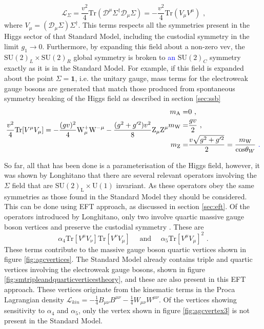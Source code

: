 %
\begin{equation}
\mathcal{L}_{\Sigma} = \frac{v^{2}}{4} \text{Tr} (\mathcal{D}^{\mu} \Sigma^{\dagger} \mathcal{D}_{\mu} \Sigma) = -\frac{v^{2}}{4}\text{Tr}(V_{\mu} V^{\mu}) \text{ ,} 
\end{equation}
%
\noindent where $V_{\mu} = (\mathcal{D}_{\mu}\Sigma) \Sigma^{\dagger}$.  This terms respects all the symmetries present in the Higgs sector of that Standard Model, including the custodial symmetry in the limit $g_{1} \rightarrow 0$.  Furthermore, by expanding this field about a non-zero vev, the $\text{SU}(2)_{L} \times \text{SU}(2)_{R}$ global symmetry is broken to \textcolor{blue}{an} $\text{SU}(2)_{C}$ symmetry exactly as it is in the Standard Model.  For example, if this field is expanded about the point $\Sigma = \textbf{1}$, i.e. the unitary gauge, mass terms for the electroweak gauge bosons are generated that match those produced from spontaneous symmetry breaking of the Higgs field as described in section \ref{sec:ssb}
%
\begin{equation}
\frac{v^{2}}{4}\text{Tr}[V^{\mu}V_{\mu}] = - \frac{(gv)^{2}}{4} \text{W}^{+}_{\mu} \text{W}^{-\mu} - \frac{(g^{2} + g'^{2})v^{2}}{8} \text{Z}_{\mu} \text{Z}^{\mu} \\
\begin{aligned}
m_{\text{A}} = & 0 \text{ ,} \\
m_{\text{W}} = & \frac{gv}{2} \text{ ,} \\
m_{\text{Z}} = & \frac{v\sqrt{g^{2} + g'^{2}}}{2} = \frac{m_{\text{W}}}{\text{cos}{\theta_{W}}} \text{ \textcolor{blue}{.}}
\end{aligned}
\end{equation}

So far, all that has been done is a parameterisation of the Higgs field, however, it was shown by Longhitano \cite{Longhitano:1980tm} that there are several relevant operators involving the $\Sigma$ field that are $\text{SU}(2)_{\text{L}} \times \text{U}(1)$ invariant.  As these operators obey the same symmetries as those found in the Standard Model they should be considered.  This can be done using EFT approach, as discussed in section \ref{sec:eft}.  Of the operators introduced by Longhitano, only two involve quartic massive gauge boson vertices and preserve the custodial symmetry \cite{Belyaev:1998ih}.  These are
%
\begin{equation}
\alpha_{4}\text{Tr}[V^{\mu}V_{\nu}]\text{Tr}[V^{\nu}V_{\mu}] \quad \text{ and } \quad \alpha_{5}\text{Tr}[V^{\mu}V_{\mu}]^{2} \text{ .}
\label{equ:newterms}
\end{equation}
%
\noindent These terms contribute to the massive gauge boson quartic vertices shown in figure \ref{fig:agcvertices}.  The Standard Model already contains triple and quartic vertices involving the electroweak gauge bosons, shown in figure \ref{fig:smtripleandquarticverticestheory}, and these are also present in this EFT approach.  These vertices originate from the kinematic terms in the Proca Lagrangian density $\mathcal{L}_{kin} = -\frac{1}{4}B_{\mu\nu}B^{\mu\nu} - \frac{1}{4}W_{\mu\nu}W^{\mu\nu}$.  Of the vertices showing sensitivity to $\alpha_{4}$ and $\alpha_{5}$, only the vertex shown in figure \ref{fig:agcvertex3} is not present in the Standard Model.  

